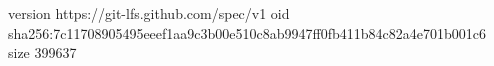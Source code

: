 version https://git-lfs.github.com/spec/v1
oid sha256:7c11708905495eeef1aa9c3b00e510c8ab9947ff0fb411b84c82a4e701b001c6
size 399637
